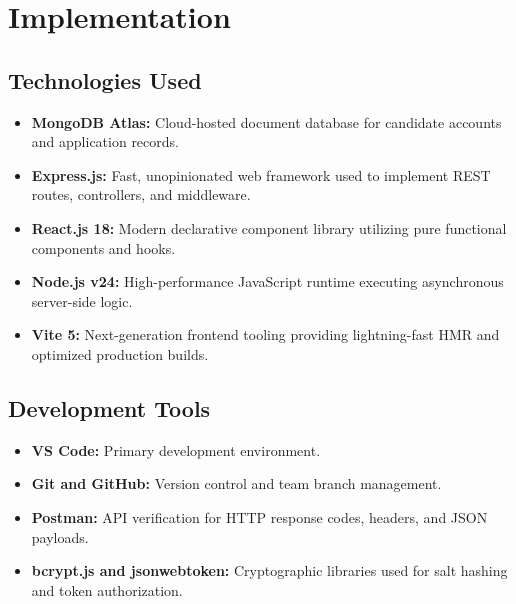 \documentclass[12pt,a4paper,oneside]{report}
\begin{document}
\chapter{Implementation}

\section{Technologies Used}
\begin{itemize}
    \item \textbf{MongoDB Atlas:} Cloud-hosted document database for candidate accounts and application records.
    \item \textbf{Express.js:} Fast, unopinionated web framework used to implement REST routes, controllers, and middleware.
    \item \textbf{React.js 18:} Modern declarative component library utilizing pure functional components and hooks.
    \item \textbf{Node.js v24:} High-performance JavaScript runtime executing asynchronous server-side logic.
    \item \textbf{Vite 5:} Next-generation frontend tooling providing lightning-fast HMR and optimized production builds.
\end{itemize}

\section{Development Tools}
\begin{itemize}
    \item \textbf{VS Code:} Primary development environment.
    \item \textbf{Git and GitHub:} Version control and team branch management.
    \item \textbf{Postman:} API verification for HTTP response codes, headers, and JSON payloads.
    \item \textbf{bcrypt.js and jsonwebtoken:} Cryptographic libraries used for salt hashing and token authorization.
\end{itemize}
\end{document}
